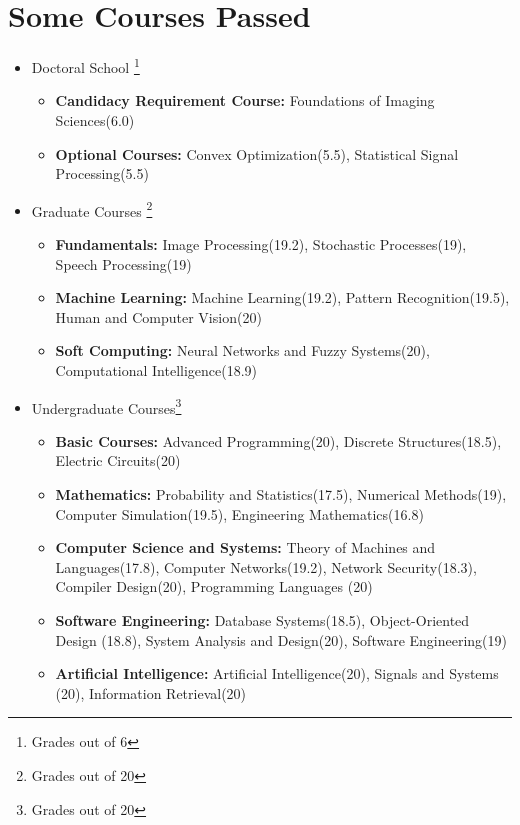 \documentclass[a4paper]{article}
\theoremstyle{definition}
\begin{document}
\section{Some Courses Passed}
\begin{itemize}
	\item{Doctoral School} \footnote{Grades out of 6}
		\begin{itemize}
			\item \textbf{Candidacy Requirement Course:} Foundations of Imaging Sciences(6.0)
			\item  \textbf{Optional Courses:} Convex Optimization(5.5), Statistical Signal Processing(5.5)
			
		\end{itemize}
	
	\item{Graduate Courses} \footnote{Grades out of 20}
		\begin{itemize}
			\item \textbf{Fundamentals:} Image Processing(19.2), Stochastic Processes(19), Speech Processing(19)
			\item \textbf{Machine Learning:} Machine Learning(19.2), Pattern Recognition(19.5), Human and Computer Vision(20)
			\item \textbf{Soft Computing:} Neural Networks and Fuzzy Systems(20), Computational Intelligence(18.9)
			
		\end{itemize}
	
	\item{Undergraduate Courses}\footnote{Grades out of 20}
		\begin{itemize}
			\item \textbf{Basic Courses:} Advanced Programming(20), Discrete Structures(18.5), Electric Circuits(20)
			\item \textbf{Mathematics:} Probability and Statistics(17.5), Numerical Methods(19), Computer Simulation(19.5), Engineering Mathematics(16.8)
			\item \textbf{Computer Science and Systems:} Theory of Machines and Languages(17.8), Computer Networks(19.2), Network Security(18.3), Compiler Design(20), Programming Languages (20)
			\item \textbf{Software Engineering:} Database Systems(18.5), Object-Oriented Design (18.8), System Analysis and Design(20), Software Engineering(19)
			\item \textbf{Artificial Intelligence:} Artificial Intelligence(20), Signals and Systems (20),  Information Retrieval(20)
			
		\end{itemize}
	
\end{itemize}
 
\end{document}
